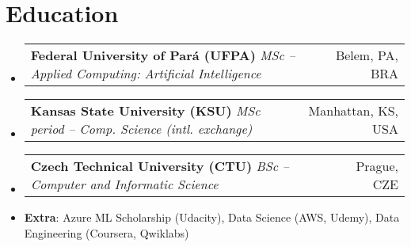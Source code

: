 \documentclass[a4paper,11pt]{article}
\makeatletter
\newcommand{\myHrefIcn}[2]{#2 \href{#1}{\scriptsize{\faExternalLink{}}}}
\newcommand{\resumeItem}[2]{
  \item\small{
    \textbf{#1}{: #2 \vspace{-2pt}}
  }
}
\newcommand{\resumeSubheadingEduFourLink}[4]{
  \vspace{-1pt}\item
    \begin{tabular*}{0.97\textwidth}{l@{\extracolsep{\fill}}r}
      \myHrefIcn{#2}{\textbf{#1}} \textit{\small#4} & #3 \\
    \end{tabular*}\vspace{-20pt}
}
\newcommand{\resumeSubItem}[2]{\resumeItem{#1}{#2}\vspace{-4pt}}
\newcommand{\resumeSubHeadingListStart}{\begin{itemize}[leftmargin=*]}
\newcommand{\resumeSubHeadingListEnd}{\end{itemize}}
\makeatother
\begin{document}
\section{Education}
  \resumeSubHeadingListStart
    \resumeSubheadingEduFourLink{%
    Federal University of Par\'a (UFPA)}
    {http://www.ppgee.ufpa.br/index.php/en/}{Belem, PA, BRA}
    {MSc -- Applied Computing: Artificial Intelligence}
    \resumeSubheadingEduFourLink{%
    Kansas State University (KSU)}
    {https://www.cs.ksu.edu/index.html}
    {Manhattan, KS, USA}
    {MSc period -- Comp. Science (intl. exchange)}
    \resumeSubheadingEduFourLink{%
    Czech Technical University (CTU)}
    {https://fel.cvut.cz/en/education/bk/plany/pl10248504.html}
    {Prague, CZE}
    {BSc -- Computer and Informatic Science}
    \vspace{0.5pt}
    \resumeSubItem{\normalsize{Extra}}{Azure ML Scholarship (Udacity), Data Science (AWS, Udemy), Data Engineering (Coursera, Qwiklabs)}
  \resumeSubHeadingListEnd
\end{document}
